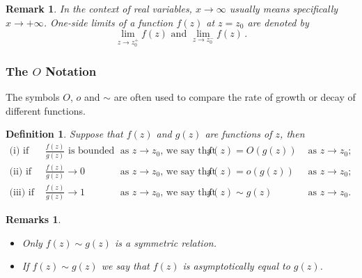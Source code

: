 \documentclass{article}
\theoremstyle{plain}\theoremheaderfont{\normalfont\itshape}\theorembodyfont{\rmfamily}\theoremseparator{.}\newtheorem*{rem}{Remark}\newtheorem*{ex}{Example}\newtheorem*{proof}{Proof}\newtheorem*{altp}{Alternative proof}
\theoremstyle{plain}\theoremheaderfont{\normalfont\bfseries}\theorembodyfont{\rmfamily}\theoremseparator{.}\newtheorem{thm}{Theorem}[section]\newtheorem{lem}[thm]{Lemma}\newtheorem{prop}[thm]{Proposition}\newtheorem*{cor}{Corollary}\newtheorem{defn}[thm]{Definition}\newtheorem{clm}[thm]{Claim}\newtheorem{clminproof}{Claim}
\theoremstyle{break}\theoremheaderfont{\normalfont\itshape}\theorembodyfont{\rmfamily}\theoremseparator{.\medskip}\newtheorem*{proofskip}{Proof}\newtheorem*{exs}{Examples}\newtheorem*{rems}{Remarks}
\theoremstyle{break}\theoremheaderfont{\normalfont\bfseries}\theorembodyfont{\rmfamily}\theoremseparator{.\medskip}\newtheorem{lemskip}[thm]{Lemma}\newtheorem{defnskip}[thm]{Definition}\newtheorem{propskip}[thm]{Proposition}\newtheorem{thmskip}[thm]{Theorem}
\numberwithin{equation}{section}
\begin{document}
	\begin{rem}
		In the context of real variables, \(x\to\infty\) usually means specifically \(x\to+\infty\). One-side limits of a function \(f(z)\) at \(z=z_0\) are denoted by
		\[\lim_{z\to z_0^+}f(z)\text{ and }\lim_{z\to z_0^-}f(z)\,.\]
	\end{rem}
	\subsubsection{The \(O\) Notation}
	The symbols \(O\), \(o\) and \(\sim\) are often used to compare the rate of growth or decay of different functions.
	
	\begin{defn}
		Suppose that \(f(z)\) and \(g(z)\) are functions of \(z\), then
		\begin{align*}
			\text{(i) }\text{if } &\frac{f(z)}{g(z)} \text{ is bounded} &\text{ as } z\to z_0 \text{, we say that } &f(z)=O(g(z)) &\text{ as } z\to z_0;\\
			\text{(ii) }\text{if } &\frac{f(z)}{g(z)}\to 0 &\text{ as } z\to z_0 \text{, we say that } &f(z)=o(g(z)) &\text{ as } z\to z_0;\\
			\text{(iii) }\text{if } &\frac{f(z)}{g(z)}\to 1 &\text{ as } z\to z_0 \text{, we say that } &f(z)\sim g(z) &\text{ as } z\to z_0.
		\end{align*}
	\end{defn}
	\begin{rems}
		\begin{itemize}[topsep=0pt]
			\item Only \(f(z)\sim g(z)\) is a symmetric relation.
			\item If \(f(z)\sim g(z)\) we say that \(f(z)\) is asymptotically equal to \(g(z)\).
		\end{itemize}
	\end{rems}
\end{document}
